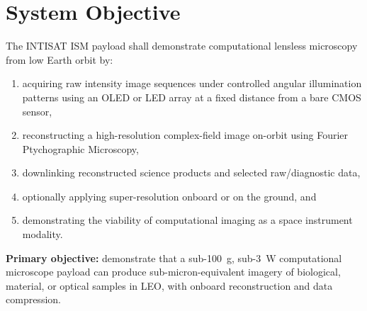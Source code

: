 \section{System Objective}

The INTISAT ISM payload shall demonstrate computational lensless microscopy from low Earth orbit by:
\begin{enumerate}[leftmargin=1.5em]
    \item acquiring raw intensity image sequences under controlled angular illumination patterns using an OLED or LED array at a fixed distance from a bare CMOS sensor,
    \item reconstructing a high-resolution complex-field image on-orbit using Fourier Ptychographic Microscopy,
    \item downlinking reconstructed science products and selected raw/diagnostic data,
    \item optionally applying super-resolution onboard or on the ground, and
    \item demonstrating the viability of computational imaging as a space instrument modality.
\end{enumerate}

\textbf{Primary objective:} demonstrate that a sub-100~g, sub-3~W computational microscope payload can produce sub-micron-equivalent imagery of biological, material, or optical samples in LEO, with onboard reconstruction and data compression.
